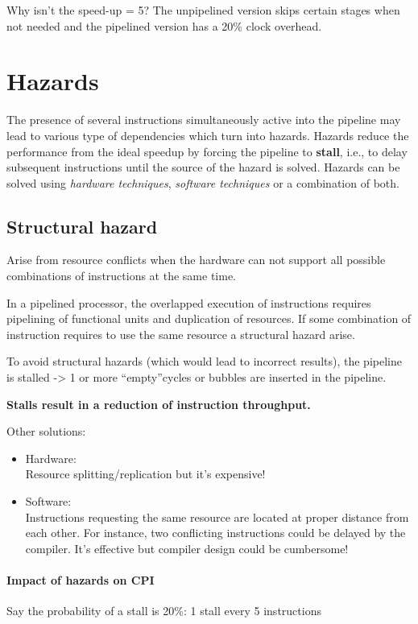 Why isn't the speed-up = 5?
The unpipelined version skips certain stages when not needed and the pipelined version has a 20\% clock overhead.

\section{Hazards}
The presence of several instructions simultaneously active into the pipeline may lead to various type of dependencies which turn into hazards. Hazards reduce the performance from the ideal speedup by forcing the pipeline to \textbf{stall}, i.e., to delay subsequent instructions until the source of the hazard is solved. Hazards can be solved using \textit{hardware techniques}, \textit{software techniques} or a combination of both.

\subsection{Structural hazard}
Arise from resource conflicts when the hardware can not support all possible combinations of instructions at the same time.

In a pipelined processor, the overlapped execution of instructions requires pipelining of functional units and duplication of resources. If some combination of instruction requires to use the same resource a structural hazard arise.

To avoid structural hazards (which would lead to incorrect results), the pipeline is stalled -> 1  or more “empty”cycles or bubbles are inserted in the pipeline.

\textbf{Stalls result in a reduction of instruction throughput.}

Other solutions:
\begin{itemize}
    \item Hardware:\\
    Resource splitting/replication but it's expensive!
    \item Software:\\
    Instructions requesting the same resource are located at proper distance from each other. For instance, two conflicting instructions could be delayed by the compiler. It's effective but compiler design could be cumbersome!
\end{itemize}

\paragraph{Impact of hazards on CPI}
Say the probability of a stall is 20\%: 1 stall every 5 instructions

